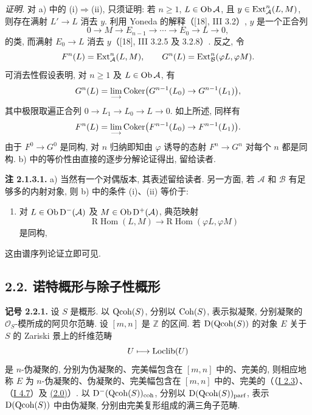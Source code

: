 \emph{证明.} 对 a) 中的 (i)$\Rightarrow$(ii), 只须证明: 若 $n\ge1$, $L\in\Ob\mathcal A$, 且 $y\in\Ext^n_{\mathcal A}(L,M)$, 则存在满射 $L'\to L$ 消去 $y$. 利用 Yoneda 的解释（[18], III 3.2）, $y$ 是一个正合列
\[
0\longrightarrow M\longrightarrow E_{n-1}\longrightarrow\cdots\longrightarrow E_0\longrightarrow L\longrightarrow0,
\]
的类, 而满射 $E_0\to L$ 消去 $y$（[18], III 3.2.5 及 3.2.8）. 反之, 令
\[
F^n(L)=\Ext^n_{\mathcal A}(L,M),\qquad
G^n(L)=\Ext^n_{\mathcal B}(\varphi L,\varphi M).
\]
可消去性假设表明, 对 $n\ge1$ 及 $L\in\Ob\mathcal A$, 有
\[
G^n(L)=\varinjlim\operatorname{Coker}\bigl(G^{n-1}(L_0)\to G^{n-1}(L_1)\bigr),
\]
其中极限取遍正合列 $0\to L_1\to L_0\to L\to0$. 如上所述, 同样有
\[
F^n(L)=\varinjlim\operatorname{Coker}\bigl(F^{n-1}(L_0)\to F^{n-1}(L_1)\bigr).
\] 由于 $F^0\to G^0$ 是同构, 对 $n$ 归纳即知由 $\varphi$ 诱导的态射 $F^n\to G^n$ 对每个 $n$ 都是同构. b) 中的等价性由直接的逐步分解论证得出, 留给读者.

\textbf{注 2.1.3.1.} a) 当然有一个对偶版本, 其表述留给读者. 另一方面, 若 $\mathcal A$ 和 $\mathcal B$ 有足够多的内射对象, 则 b) 中的条件 (i)、(ii) 等价于:
\begin{enumerate}[label=(\roman*),start=3]
\item 对 $L\in\Ob\mathrm D^{-}(\mathcal A)$ 及 $M\in\Ob\mathrm D^{+}(\mathcal A)$, 典范映射
\[
\mathrm R\!\operatorname{Hom}(L,M)\longrightarrow
\mathrm R\!\operatorname{Hom}(\varphi L,\varphi M)
\]
是同构,
\end{enumerate}
这由谱序列论证立即可见.

\subsection*{2.2. 诺特概形与除子性概形}

\textbf{记号 2.2.1.} 设 $S$ 是概形. 以 $\Qcoh(S)$, 分别以 $\Coh(S)$, 表示拟凝聚, 分别凝聚的 $\mathcal O_S$-模所成的阿贝尔范畴. 设 $[m,n]$ 是 $\mathbb Z$ 的区间. 若 $\mathrm D(\Qcoh(S))$ 的对象 $E$ 关于 $S$ 的 Zariski 景上的纤维范畴
\[
U\longmapsto \Loclib(U)
\]
是 $n$-伪凝聚的, 分别为伪凝聚的、完美幅包含在 $[m,n]$ 中的、完美的, 则相应地称 $E$ 为 $n$-伪凝聚的、伪凝聚的、完美幅包含在 $[m,n]$ 中的、完美的（（\hyperlink{sga6.e01.def.2-3}{I 2.3}）、（\hyperlink{sga6.e01.def.4-7}{I 4.7}）及 \hyperlink{sga6.e02.sec.2.0}{(2.0)}）. 以 $\mathrm D^{-}(\Qcoh(S))_{\coh}$, 分别以 $\mathrm D(\Qcoh(S))_{\parf}$, 表示 $\mathrm D(\Qcoh(S))$ 中由伪凝聚, 分别由完美复形组成的满三角子范畴.

